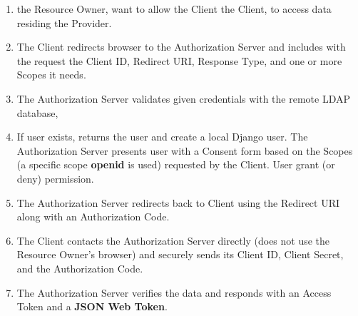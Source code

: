 \begin{enumerate}
	\item the Resource Owner, want to allow the Client the Client, to access data residing the Provider.
	
	\item The Client redirects browser to the Authorization Server and includes with the request the Client ID, Redirect URI, Response Type, and one or more Scopes it needs.
	
	\item  The Authorization Server validates given credentials with the remote LDAP database, 
	
	\item If user exists, returns the user and create a local Django user. The Authorization Server presents user with a Consent form based on the Scopes (a specific scope \textbf{openid} is used) requested by the Client. User grant (or deny) permission.
	
	\item The Authorization Server redirects back to Client using the Redirect URI along with an Authorization Code.
	
	\item The Client contacts the Authorization Server directly (does not use the Resource Owner’s browser) and securely sends its Client ID, Client Secret, and the Authorization Code.
	
	\item The Authorization Server verifies the data and responds with an Access Token and a \textbf{JSON Web Token}.
	
\end{enumerate}

